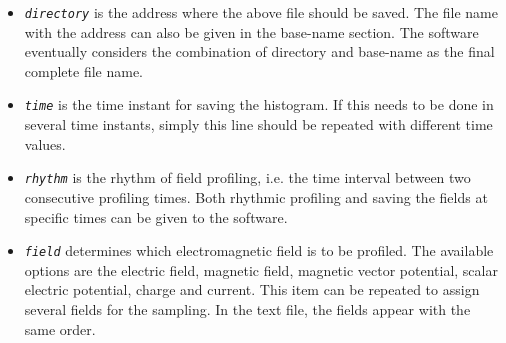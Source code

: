 \begin{enumerate}
\begin{itemize}
	\item {\tt \small \em directory} is the address where the above file should be saved. The file name with the address can also be given in the base-name section. The software eventually considers the combination of directory and base-name as the final complete file name.
	\item {\tt \small \em time} is the time instant for saving the histogram. If this needs to be done in several time instants, simply this line should be repeated with different time values.
	\item {\tt \small \em rhythm} is the rhythm of field profiling, i.e. the time interval between two consecutive profiling times. Both rhythmic profiling and saving the fields at specific times can be given to the software.
	\item {\tt \small \em field} determines which electromagnetic field is to be profiled. The available options are the electric field, magnetic field, magnetic vector potential, scalar electric potential, charge and current. This item can be repeated to assign several fields for the sampling. In the text file, the fields appear with the same order.
\end{itemize}
\end{enumerate}

